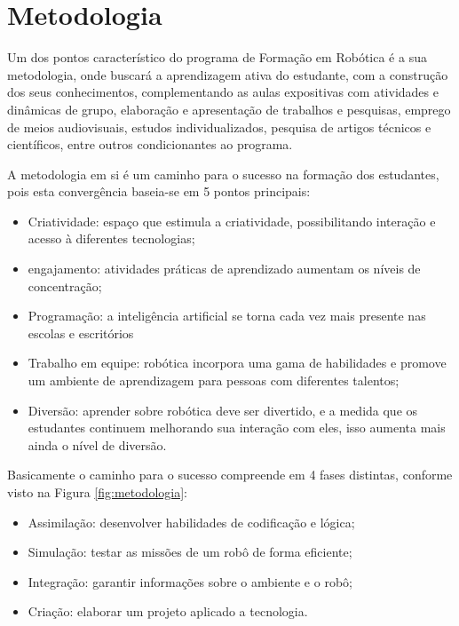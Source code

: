 \chapter{Metodologia}
\label{chap:met}

Um dos pontos característico do programa de Formação em Robótica é a sua metodologia, onde buscará a aprendizagem ativa do estudante, com a construção dos seus conhecimentos, complementando as aulas expositivas com atividades e dinâmicas de grupo, elaboração e apresentação de trabalhos e pesquisas, emprego de meios audiovisuais, estudos individualizados, pesquisa de artigos técnicos e científicos, entre outros condicionantes ao programa.

A metodologia em si é um caminho para o sucesso na formação dos estudantes, pois esta convergência baseia-se em 5 pontos principais:

\begin{itemize}
  \item Criatividade: espaço que estimula a criatividade, possibilitando interação e acesso à diferentes tecnologias;
  \item engajamento: atividades práticas de aprendizado aumentam os níveis de concentração;
  \item Programação: a inteligência artificial se torna cada vez mais presente nas escolas e escritórios
  \item Trabalho em equipe: robótica incorpora uma gama de habilidades e promove um ambiente de aprendizagem para pessoas com diferentes talentos;
  \item Diversão: aprender sobre robótica deve ser divertido, e a medida que os estudantes continuem melhorando sua interação com eles, isso aumenta mais ainda o nível de diversão.
\end{itemize}

Basicamente o caminho para o sucesso compreende em 4 fases distintas, conforme visto na Figura \ref{fig:metodologia}:

\begin{itemize}
  \item Assimilação: desenvolver habilidades de codificação e lógica;
  \item Simulação: testar as missões de um robô de forma eficiente;
  \item Integração: garantir informações sobre o ambiente e o robô;
  \item Criação: elaborar um projeto aplicado a tecnologia.
\end{itemize}

